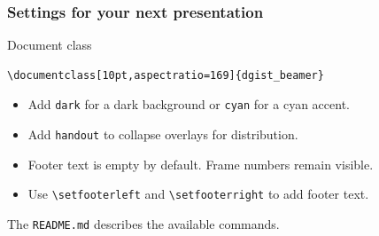 \documentclass[10pt,aspectratio=169]{dgist_beamer}
\begin{document}
\begin{frame}[fragile]
  \frametitle{Settings for your next presentation}
  \begin{block}{Document class}
\begin{verbatim}
\documentclass[10pt,aspectratio=169]{dgist_beamer}
\end{verbatim}
  \end{block}
  \begin{itemize}
    \setlength{\itemsep}{.18cm}
    \item Add \texttt{dark} for a dark background or \texttt{cyan} for a cyan accent.
    \item Add \texttt{handout} to collapse overlays for distribution.
    \item Footer text is empty by default. Frame numbers remain visible.
    \item Use \verb|\setfooterleft| and \verb|\setfooterright| to add footer text.
  \end{itemize}
  \vspace{.18cm}
  The \texttt{README.md} describes the available commands.
\end{frame}

\end{document}
